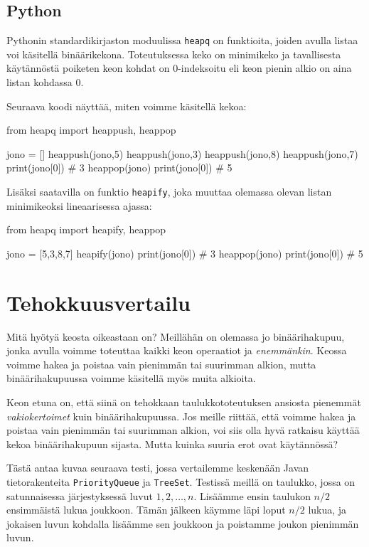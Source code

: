 \subsection{Python}

Pythonin standardikirjaston moduulissa \texttt{heapq} on funktioita,
joiden avulla listaa voi käsitellä binäärikekona.
Toteutuksessa keko on minimikeko ja tavallisesta käytännöstä
poiketen keon kohdat on 0-indeksoitu eli keon pienin alkio on aina
listan kohdassa 0.

Seuraava koodi näyttää, miten voimme käsitellä kekoa:

\begin{code}
from heapq import heappush, heappop

jono = []
heappush(jono,5)
heappush(jono,3)
heappush(jono,8)
heappush(jono,7)
print(jono[0]) # 3
heappop(jono)
print(jono[0]) # 5
\end{code}

Lisäksi saatavilla on funktio \texttt{heapify},
joka muuttaa olemassa olevan listan minimikeoksi
lineaarisessa ajassa:

\begin{code}
from heapq import heapify, heappop

jono = [5,3,8,7]
heapify(jono)
print(jono[0]) # 3
heappop(jono)
print(jono[0]) # 5
\end{code}

\section{Tehokkuusvertailu}

Mitä hyötyä keosta oikeastaan on?
Meillähän on olemassa jo binäärihakupuu,
jonka avulla voimme toteuttaa kaikki keon operaatiot
ja \emph{enemmänkin}.
Keossa voimme hakea ja poistaa vain pienimmän tai suurimman alkion,
mutta binäärihakupuussa voimme käsitellä myös muita alkioita.

Keon etuna on, että siinä on tehokkaan taulukkototeutuksen
ansiosta pienemmät \emph{vakiokertoimet} kuin binäärihakupuussa.
Jos meille riittää, että voimme hakea ja poistaa
vain pienimmän tai suurimman alkion, voi siis olla hyvä
ratkaisu käyttää kekoa binäärihakupuun sijasta.
Mutta kuinka suuria erot ovat käytännössä?

Tästä antaa kuvaa seuraava testi,
jossa vertailemme keskenään Javan tietorakenteita
\texttt{PriorityQueue} ja \texttt{TreeSet}.
Testissä meillä on taulukko,
jossa on satunnaisessa järjestyksessä luvut $1,2,\dots,n$.
Lisäämme ensin taulukon $n/2$ ensimmäistä lukua joukkoon.
Tämän jälkeen käymme läpi loput $n/2$ lukua,
ja jokaisen luvun kohdalla lisäämme sen joukkoon ja
poistamme joukon pienimmän luvun.


